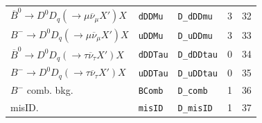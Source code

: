 \begin{table}[!htb]
\begin{tabular}{lllrr}
 $\overline{B}^0 \rightarrow D^0 D_q (\rightarrow \mu \overline{\nu}_\mu X') X$       & \texttt{dDDMu}                    & \texttt{D\_dDDmu}          &                     3 &               32 \\
 $B^- \rightarrow D^0 D_q (\rightarrow \mu \overline{\nu}_\mu X') X$                  & \texttt{uDDMu}                    & \texttt{D\_uDDmu}          &                     3 &               33 \\
 $\overline{B}^0 \rightarrow D^0 D_q (\rightarrow \tau \overline{\nu}_\tau X') X$     & \texttt{dDDTau}                   & \texttt{D\_dDDtau}         &                     0 &               34 \\
 $B^- \rightarrow D^0 D_q (\rightarrow \tau \overline{\nu}_\tau X') X$                & \texttt{uDDTau}                   & \texttt{D\_uDDtau}         &                     0 &               35 \\
 $B^-$ comb. bkg.                                                                     & \texttt{BComb}                    & \texttt{D\_comb}           &                     1 &               36 \\
 misID.                                                                               & \texttt{misID}                    & \texttt{D\_misID}          &                     1 &               37 \\
\bottomrule
\end{tabular}

\end{table}



